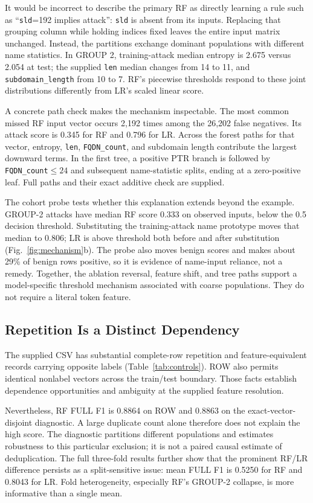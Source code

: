 \documentclass[conference]{IEEEtran}
\newcommand{\code}[1]{\texttt{#1}}
\begin{document}
It would be incorrect to describe the primary RF as directly learning a rule such as ``\code{sld}=192 implies attack'': \code{sld} is absent from its inputs. Replacing that grouping column while holding indices fixed leaves the entire input matrix unchanged. Instead, the partitions exchange dominant populations with different name statistics. In GROUP 2, training-attack median entropy is 2.675 versus 2.054 at test; the supplied \code{len} median changes from 14 to 11, and \code{subdomain\_length} from 10 to 7. RF's piecewise thresholds respond to these joint distributions differently from LR's scaled linear score.

A concrete path check makes the mechanism inspectable. The most common missed RF input vector occurs 2,192 times among the 26,202 false negatives. Its attack score is 0.345 for RF and 0.796 for LR. Across the forest paths for that vector, entropy, \code{len}, \code{FQDN\_count}, and subdomain length contribute the largest downward terms. In the first tree, a positive PTR branch is followed by \code{FQDN\_count}$\leq24$ and subsequent name-statistic splits, ending at a zero-positive leaf. Full paths and their exact additive check are supplied.

The cohort probe tests whether this explanation extends beyond the example. GROUP-2 attacks have median RF score 0.333 on observed inputs, below the 0.5 decision threshold. Substituting the training-attack name prototype moves that median to 0.806; LR is above threshold both before and after substitution (Fig.~\ref{fig:mechanism}b). The probe also moves benign scores and makes about 29\% of benign rows positive, so it is evidence of name-input reliance, not a remedy. Together, the ablation reversal, feature shift, and tree paths support a model-specific threshold mechanism associated with coarse populations. They do not require a literal token feature.

\subsection{Repetition Is a Distinct Dependency}
The supplied CSV has substantial complete-row repetition and feature-equivalent records carrying opposite labels (Table~\ref{tab:controls}). ROW also permits identical nonlabel vectors across the train/test boundary. Those facts establish dependence opportunities and ambiguity at the supplied feature resolution.

Nevertheless, RF FULL F1 is 0.8864 on ROW and 0.8863 on the exact-vector-disjoint diagnostic. A large duplicate count alone therefore does not explain the high score. The diagnostic partitions different populations and estimates robustness to this particular exclusion; it is not a paired causal estimate of deduplication. The full three-fold results further show that the prominent RF/LR difference persists as a split-sensitive issue: mean FULL F1 is 0.5250 for RF and 0.8043 for LR. Fold heterogeneity, especially RF's GROUP-2 collapse, is more informative than a single mean.
\end{document}

